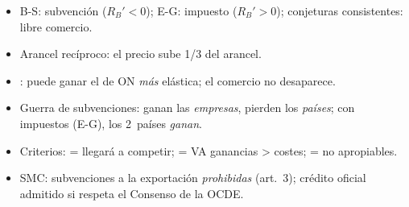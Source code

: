 \documentclass{article}
\begin{document}
\begin{columnas}
\begin{trampa}
\begin{itemize}
\item B-S: subvención ($R_B'<0$); E-G: impuesto ($R_B'>0$); conjeturas consistentes: libre comercio.
\item Arancel recíproco: el precio sube 1/3 del arancel.
\item {}: puede ganar el de ON \emph{más} elástica; el comercio no desaparece.
\item Guerra de subvenciones: ganan las \emph{empresas}, pierden los \emph{países}; con impuestos (E-G), los 2~países \emph{ganan}.
\item Criterios:  = llegará a competir;  = VA ganancias > costes;  = no apropiables.
\item SMC: subvenciones a la exportación \emph{prohibidas} (art.~3); crédito oficial admitido si respeta el Consenso de la OCDE.
\end{itemize}
\end{trampa}

\end{columnas}
\end{document}
